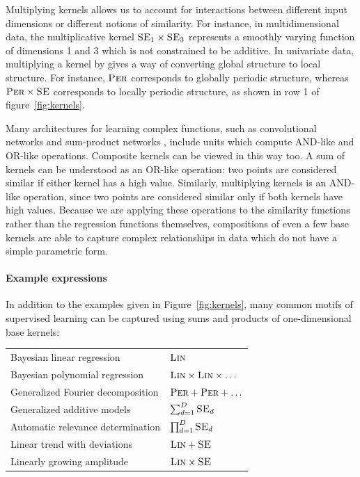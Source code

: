 \documentclass[twoside]{article}
\begin{document}
Multiplying kernels allows us to account for interactions between different input dimensions or different notions of similarity. 
For instance, in multidimensional data, the multiplicative kernel $\textsc{SE}_1 \times \textsc{SE}_3$ represents a smoothly varying function of dimensions 1 and 3 which is not constrained to be additive.
In univariate data, multiplying a kernel by \kSE{} gives a way of converting global structure to local structure. 
For instance, $\textsc{Per}$ corresponds to globally periodic structure, whereas $\textsc{Per} \times \textsc{SE}$ corresponds to locally periodic structure, as shown in row 1 of figure~\ref{fig:kernels}.

Many architectures for learning complex functions, such as convolutional networks \cite{lecun1989backpropagation} and sum-product networks \cite{poon2011sum}, include units which compute AND-like and OR-like operations.
Composite kernels can be viewed in this way too. A sum of kernels can be understood as an OR-like operation: two points are considered similar if either kernel has a high value.
Similarly, multiplying kernels is an AND-like operation, since two points are considered similar only if both kernels have high values.
Because we are applying these operations to the similarity functions rather than the regression functions themselves, compositions of even a few base kernels are able to capture complex relationships in data which do not have a simple parametric form.

\paragraph{Example expressions}

In addition to the examples given in Figure~\ref{fig:kernels}, many common motifs of supervised learning can be captured using sums and products of one-dimensional base kernels:

\begin{tabular}{l|l}
Bayesian linear regression & $\textsc{Lin}$ \\
Bayesian polynomial regression & $\textsc{Lin} \times \textsc{Lin} \times \ldots$\\
Generalized Fourier decomposition & $\textsc{Per} + \textsc{Per} + \ldots$ \\
Generalized additive models & $\sum_{d=1}^D \textsc{SE}_d$ \\
Automatic relevance determination & $\prod_{d=1}^D \textsc{SE}_d$ \\
Linear trend with deviations & $\textsc{Lin} + \textsc{SE}$ \\
Linearly growing amplitude & $\textsc{Lin} \times \textsc{SE}$
\end{tabular}
\end{document}
